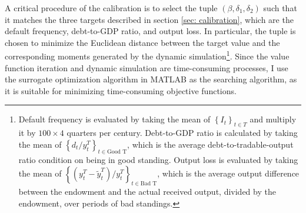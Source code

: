 A critical procedure of the calibration is to select the tuple $(\beta, \delta_1, \delta_2)$ such that it matches the three targets described in section \ref{sec: calibration}, which are the default frequency, debt-to-GDP ratio, and output loss.
In particular, the tuple is chosen to minimize the Euclidean distance between the target value and the corresponding moments generated by the dynamic simulation\footnote{
    Default frequency is evaluated by taking the mean of $\left\{ I_{t} \right\}_{t \in T}$ and multiply it by $100\times 4$ quarters per century. Debt-to-GDP ratio is calculated by taking the mean of $\left\{ d_t / y^T_t \right\}_{t \in \text{Good T}}$, which is the average debt-to-tradable-output ratio condition on being in good standing. Output loss is evaluated by taking the mean of $\left\{ (y^T_t - \tilde{y}^T_t)/y^T_t \right\}_{t \in \text{Bad T}}$, which is the average output difference between the endowment and the actual received output, divided by the endowment, over periods of bad standings.
}. Since the value function iteration and dynamic simulation are time-consuming processes, I use the surrogate optimization algorithm in MATLAB as the searching algorithm, as it is suitable for minimizing time-consuming objective functions.


